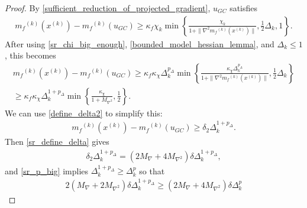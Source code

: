 \documentclass{article}
\theoremstyle{case}
\numberwithin{theorem}{subsection}
\newcommand{\dk}{\Delta_k}
\newcommand{\maxgrad}{{M_{\nabla}}}
\newcommand{\maxhessian}{{M_{\nabla^2}}}
\newcommand{\mfk}{{{m}_f}^{(k)}}
\newcommand{\xk}{{x^{(k)}}}
\begin{document}
\begin{proof}
By \cref{sufficient_reduction_of_projected_gradient}, $u_{GC}$ satisfies
\begin{align*}
\mfk(\xk) - \mfk(u_{GC}) \ge \kappa_f \chi_k \min\left\{ \frac{\chi_k}{1+\|\nabla^2 \mfk(\xk)\|}, \frac 1 2 \dk, 1 \right\}.
\end{align*}
After using \cref{sr_chi_big_enough}, \cref{bounded_model_hessian_lemma}, and $\dk \le 1$, this becomes
\begin{align*}
\mfk(\xk) - \mfk(u_{GC})
\ge \kappa_f \kappa_{\chi} \dk^{p_{\Delta}} \min\left\{ \frac{\kappa_{\chi} \dk^{p_{\Delta}}}{1+\|\nabla^2 \mfk(\xk)\|}, \frac 1 2 \dk \right\} \\
\ge \kappa_f \kappa_{\chi} \dk^{1 + p_{\Delta}} \min\left\{ \frac{\kappa_{\chi}}{1 + \maxhessian}, \frac 1 2  \right\}.
\end{align*}
We can use \cref{define_delta2} to simplify this:
\begin{align*}
\mfk(\xk) - \mfk(u_{GC}) \ge \delta_2 \dk^{1 + p_{\Delta}}.
\end{align*}
Then \cref{sr_define_delta} gives
\begin{align*}
\delta_2 \dk^{1 + p_{\Delta}} = \left(2\maxgrad + 4\maxhessian\right)\delta\dk^{1 + p_{\Delta}},
\end{align*}
and \cref{sr_p_big} implies $\dk^{1+p_{\Delta}} \ge \dk^p$ so that
\begin{align*}
2\left(\maxgrad + 2\maxhessian\right)\delta\dk^{1 + p_{\Delta}}
\ge \left(2\maxgrad + 4\maxhessian\right)\delta\dk^{p}
\end{align*}



\end{proof}
\end{document}
